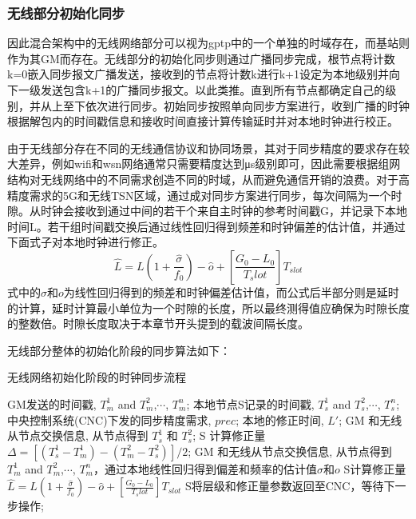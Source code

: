 \documentclass[UTF8,a4paper,12pt]{ctexart}
\numberwithin{equation}{section}
\begin{document}
\subsubsection{无线部分初始化同步}
因此混合架构中的无线网络部分可以视为gptp中的一个单独的时域存在，而基站则作为其GM而存在。无线部分的初始化同步则通过广播同步完成，根节点将计数k=0嵌入同步报文广播发送，接收到的节点将计数k进行k+1设定为本地级别并向下一级发送包含k+1的广播同步报文。以此类推。直到所有节点都确定自己的级别，并从上至下依次进行同步。初始同步按照单向同步方案进行，收到广播的时钟根据解包内的时间戳信息和接收时间直接计算传输延时并对本地时钟进行校正。

由于无线部分存在不同的无线通信协议和协同场景，其对于同步精度的要求存在较大差异，例如wifi和wsn网络通常只需要精度达到μs级别即可，因此需要根据组网结构对无线网络中的不同需求创造不同的时域，从而避免通信开销的浪费。对于高精度需求的5G和无线TSN区域，通过成对同步方案进行同步，每次间隔为一个时隙。从时钟会接收到通过中间的若干个来自主时钟的参考时间戳G，并记录下本地时间L。若干组时间戳交换后通过线性回归得到频差和时钟偏差的估计值，并通过下面式子对本地时钟进行修正。
\begin{equation}
	\widehat{L}=L(1+\frac{\widehat{\sigma}}{f_0})-\widehat{o}+[\frac{G_0-L_0}{T_slot}]T_{slot}
\end{equation}
式中的$\sigma$和$o$为线性回归得到的频差和时钟偏差估计值，而公式后半部分则是延时的计算，延时计算最小单位为一个时隙的长度，所以最终测得值应确保为时隙长度的整数倍。时隙长度取决于本章节开头提到的载波间隔长度。

无线部分整体的初始化阶段的同步算法如下：
\begin{algorithm}[ht]  
	\caption{无线网络初始化阶段的时钟同步流程}  
	\begin{algorithmic}[1]
		\REQUIRE GM发送的时间戳, $T_m^1$ and $T_m^2$,$\cdots$, $T_m^n$; 本地节点S记录的时间戳, $T_s^1$ and $T_s^2$,$\cdots$, $T_s^n$; 中央控制系统(CNC)下发的同步精度需求, $prec$;
		\ENSURE 本地的修正时间, $L'$;
		\STATE GM 和无线从节点交换信息, 从节点得到 $T_s^1$ 和 $T_s^2$; 
		\STATE S 计算修正量 $\Delta = [(T_s^1 - T_m^1) - (T_m^2 - T_s^2)]/2$;
		\ELSE  
		\STATE GM 和无线从节点交换信息, 从节点得到 $T_m^1$ and $T_m^2$,$\cdots$, $T_m^n$，通过本地线性回归得到偏差和频率的估计值$\sigma$和$o$	
		\STATE S计算修正量$\widehat{L}=L(1+\frac{\widehat{\sigma}}{f_0})-\widehat{o}+[\frac{G_0-L_0}{T_slot}]T_{slot}$			
		\ENDIF
		\STATE S将层级和修正量参数返回至CNC，等待下一步操作;
		\ENDWHILE
		\ENDWHILE
	\end{algorithmic}
\end{algorithm}
\end{document}
